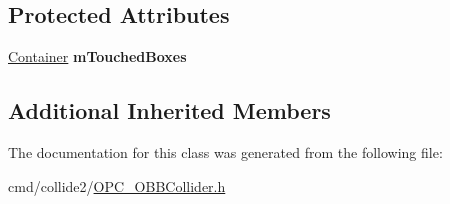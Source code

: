 \subsection*{Protected Attributes}
\begin{DoxyCompactItemize}
\item 
\hyperlink{classContainer}{Container} {\bfseries m\+Touched\+Boxes}\hypertarget{classHybridOBBCollider_a1a98a4480ed5b011d490d26ebac8c8e9}{}\label{classHybridOBBCollider_a1a98a4480ed5b011d490d26ebac8c8e9}

\end{DoxyCompactItemize}
\subsection*{Additional Inherited Members}


The documentation for this class was generated from the following file\+:\begin{DoxyCompactItemize}
\item 
cmd/collide2/\hyperlink{OPC__OBBCollider_8h}{O\+P\+C\+\_\+\+O\+B\+B\+Collider.\+h}\end{DoxyCompactItemize}
